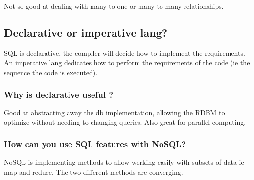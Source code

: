 \documentclass[11pt]{scrartcl} %
\begin{document}
Not so good at dealing with many to one or many to many relationships.

\subsection{Declarative or imperative lang?}

SQL is declarative, the compiler will decide how to implement the requirements. An imperative lang dedicates how to perform
the requirements of the code (ie the sequence the code is executed).

\subsubsection{Why is declarative useful ?}

Good at abstracting away the db implementation, allowing the RDBM to optimize without needing to changing queries. Also
great for parallel computing.

\subsubsection{How can you use SQL features with NoSQL?}

NoSQL is implementing methods to allow working easily with subsets of data ie map and reduce. The two different methods
are converging.




\end{document}
